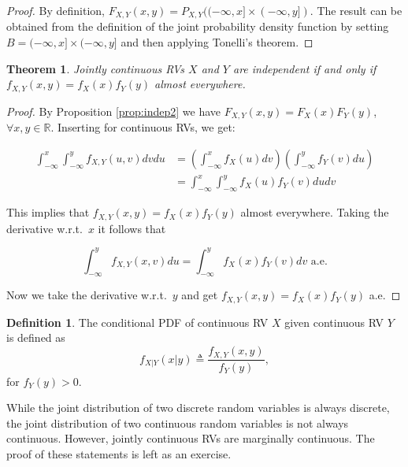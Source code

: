 \documentclass{book}
\theoremstyle{plain}%
\newtheorem{theorem}{Theorem}[section]
\theoremstyle{definition}
\newtheorem{definition}{Definition}[section]
\begin{document}
\begin{proof}
 By definition, $F_{X,Y}(x,y) = P_{X,Y}((-\infty, x] \times (-\infty, y])$. The result can be obtained from the definition of the joint probability density function by setting $B = (-\infty, x] \times (-\infty, y]$ and then applying Tonelli's theorem.
\end{proof}

\begin{theorem}
Jointly continuous RVs $X$ and $Y$ are independent if and only if $f_{X,Y}(x,y) = f_X(x)f_Y(y)$ almost everywhere.
\end{theorem}

\begin{proof}
By Proposition \ref{prop:indep2} we have $F_{X,Y}(x,y) = F_X(x)F_Y(y)$, $\forall x,y \in \mathbb{R}$. Inserting for continuous RVs, we get:

\begin{align*}
\int_{-\infty}^x \int_{-\infty}^y f_{X,Y}(u,v)dv du &= \left(\int_{-\infty}^x f_{X}(u)dv\right)\left( \int_{-\infty}^y f_{Y}(v)du\right)\\
&= \int_{-\infty}^x \int_{-\infty}^y f_{X}(u) f_{Y}(v)du dv
\end{align*}

This implies that $f_{X,Y}(x,y) = f_{X}(x)f_{Y}(y)$ almost everywhere. Taking the derivative w.r.t.\ $x$ it follows that

    $$
    \int_{-\infty}^y f_{X,Y}(x,v)du
    =
    \int_{-\infty}^y f_{X}(x)f_Y(v)dv
     \text{ a.e.}$$
    
Now we take the derivative w.r.t.\ $y$ and get $f_{X,Y}(x,y)=f_X(x)f_Y(y)$ a.e.
\end{proof}

\begin{definition}
The conditional PDF of continuous RV $X$ given continuous RV $Y$ is defined as
$$f_{X|Y}(x|y) \triangleq \frac{f_{X,Y}(x,y)}{f_Y(y)},$$
for $f_Y(y) > 0$.
\end{definition}


While the joint distribution of two discrete random variables is always discrete, the joint distribution of two continuous random variables is not always continuous. However, jointly continuous RVs are marginally continuous. The proof of these statements is left as an exercise.
\end{document}

